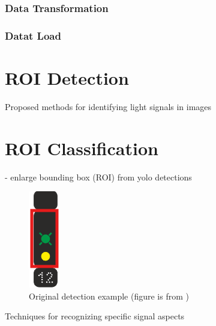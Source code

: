 \documentclass[english, ing, kiv, he, iso690alph, pdf, viewonly]{fasthesis}
\begin{document}
\subsubsection{Data Transformation}


\subsubsection{Datat Load}


\newpage
\section{ROI Detection}

Proposed methods for identifying light signals in images




\section{ROI Classification}
- enlarge bounding box (ROI) from yolo detections

\begin{figure}[!ht]
    \centering
    \includegraphics[width=0.07\linewidth]{myimgs/example_roi.png}
    \caption{Original detection example (figure is from \cite{sprava_zeleznic_predpis})}
    \label{fig:original detection example}
\end{figure}


Techniques for recognizing specific signal aspects





\end{document}
